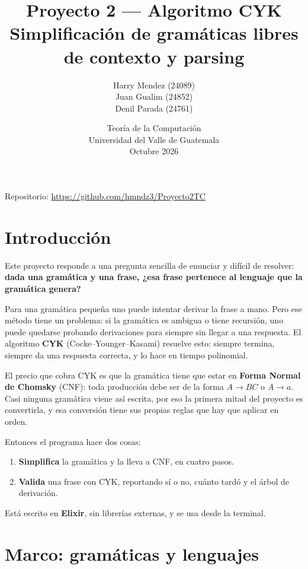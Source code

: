 \documentclass[11pt,a4paper]{article}
\title{\vspace{-1.5cm}\textbf{Proyecto 2 — Algoritmo CYK}\\[0.3cm]
\large Simplificación de gramáticas libres de contexto y parsing}
\author{%
  Harry Mendez (24089) \\
  Juan Gualim (24852) \\
  Denil Parada (24761)
}
\date{Teoría de la Computación \\ Universidad del Valle de Guatemala \\[0.2cm] Octubre 2026}
\begin{document}
\maketitle

\begin{center}
\small Repositorio: \url{https://github.com/hmndz3/Proyecto2TC}
\end{center}

\vspace{0.5cm}
\tableofcontents
\newpage

\section{Introducción}

Este proyecto responde a una pregunta sencilla de enunciar y difícil de
resolver: \textbf{dada una gramática y una frase, ¿esa frase pertenece al
lenguaje que la gramática genera?}

Para una gramática pequeña uno puede intentar derivar la frase a mano. Pero
ese método tiene un problema: si
la gramática es ambigua o tiene recursión, uno puede quedarse probando
derivaciones para siempre sin llegar a una respuesta. El algoritmo
\textbf{CYK} (Cocke--Younger--Kasami) resuelve esto: siempre termina, siempre
da una respuesta correcta, y lo hace en tiempo polinomial.

El precio que cobra CYK es que la gramática tiene que estar en
\textbf{Forma Normal de Chomsky} (CNF): toda producción debe ser de la forma
$A \to BC$ o $A \to a$. Casi ninguna gramática viene así escrita, por eso la
primera mitad del proyecto es convertirla, y esa conversión tiene sus propias
reglas que hay que aplicar en orden.

Entonces el programa hace dos cosas:

\begin{enumerate}[leftmargin=*]
  \item \textbf{Simplifica} la gramática y la lleva a CNF, en cuatro pasos.
  \item \textbf{Valida} una frase con CYK, reportando sí o no, cuánto tardó y
  el árbol de derivación.
\end{enumerate}

Está escrito en \textbf{Elixir}, sin librerías externas, y se usa desde la
terminal.

\section{Marco: gramáticas y lenguajes}
\end{document}
